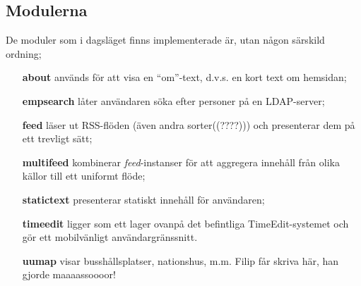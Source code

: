 \subsection{Modulerna}
De moduler som i dagsläget finns implementerade är, utan någon särskild ordning;

\begin{itemize}
\item[\bf{about}] används för att visa en ``om''-text, d.v.s. en kort text om
hemsidan;

\item[\bf{empsearch}] låter användaren söka efter personer på en LDAP-server;

\item[\bf{feed}] läser ut RSS-flöden (även andra sorter((????))) och
presenterar dem på ett trevligt sätt;

\item[\bf{multifeed}] kombinerar \emph{feed}-instanser för att aggregera
innehåll från olika källor till ett uniformt flöde;

\item[\bf{statictext}] presenterar statiskt innehåll för användaren;

\item[\bf{timeedit}] ligger som ett lager ovanpå det befintliga
TimeEdit-systemet och gör ett mobilvänligt användargränssnitt.

\item[\bf{uumap}] visar busshållsplatser, nationshus, m.m. Filip får skriva
här, han gjorde maaaassoooor!

\end{itemize}
